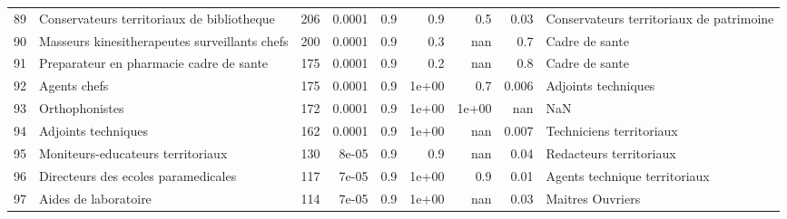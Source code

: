 \documentclass[11pt,a4paper]{article}
\begin{document}
\begin{tabular}{llrrrrrrl}
	89  &         Conservateurs territoriaux de bibliotheque &            206 &         0.0001 &                    0.9 &                0.9 &                               0.5 &                                     0.03 &           Conservateurs territoriaux de patrimoine \\
	90  &      Masseurs kinesitherapeutes surveillants chefs &            200 &         0.0001 &                    0.9 &                0.3 &                               nan &                                      0.7 &                                     Cadre de sante \\
	91  &            Preparateur en pharmacie cadre de sante &            175 &         0.0001 &                    0.9 &                0.2 &                               nan &                                      0.8 &                                     Cadre de sante \\
	92  &                                       Agents chefs &            175 &         0.0001 &                    0.9 &              1e+00 &                               0.7 &                                    0.006 &                                Adjoints techniques \\
	93  &                                     Orthophonistes &            172 &         0.0001 &                    0.9 &              1e+00 &                             1e+00 &                                      nan &                                                NaN \\
	94  &                                Adjoints techniques &            162 &         0.0001 &                    0.9 &              1e+00 &                               nan &                                    0.007 &                           Techniciens territoriaux \\
	95  &                  Moniteurs-educateurs territoriaux &            130 &          8e-05 &                    0.9 &                0.9 &                               nan &                                     0.04 &                            Redacteurs territoriaux \\
	96  &                Directeurs des ecoles paramedicales &            117 &          7e-05 &                    0.9 &              1e+00 &                               0.9 &                                     0.01 &                      Agents technique territoriaux \\
	97  &                               Aides de laboratoire &            114 &          7e-05 &                    0.9 &              1e+00 &                               nan &                                     0.03 &                                   Maitres Ouvriers \\

\end{tabular}
\end{document}

